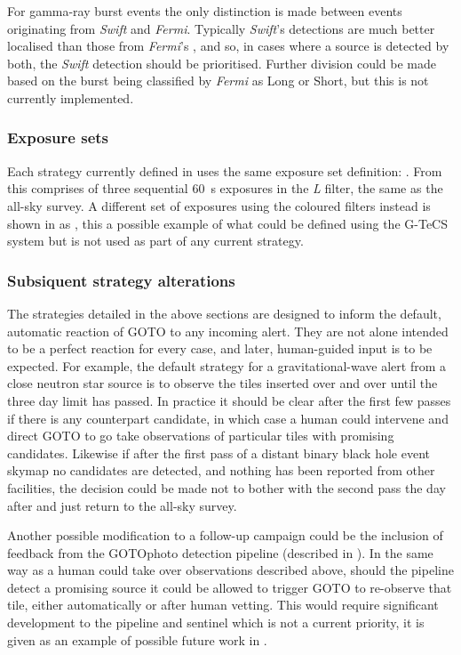 \begin{colsection}
For gamma-ray burst events the only distinction is made between events originating from \textit{Swift} and \textit{Fermi}. Typically \textit{Swift}'s  detections are much better localised than those from \textit{Fermi}'s , and so, in cases where a source is detected by both, the \textit{Swift} detection should be prioritised. Further division could be made based on the burst being classified by \textit{Fermi} as Long or Short, but this is not currently implemented.

\subsubsection{Exposure sets}

Each strategy currently defined in  uses the same exposure set definition: . From  this comprises of three sequential \SI{60}{\second} exposures in the \textit{L} filter, the same as the all-sky survey. A different set of exposures using the coloured filters instead is shown in  as , this a possible example of what could be defined using the G-TeCS system  but is not used as part of any current strategy.  %

\subsubsection{Subsiquent strategy alterations}

The strategies detailed in the above sections are designed to inform the default, automatic reaction of GOTO to any incoming alert. They are not alone intended to be a perfect reaction for every case, and later, human-guided input is to be expected. For example, the default strategy for a gravitational-wave alert from a close neutron star source is to observe the tiles inserted over and over until the three day limit has passed. In practice it should be clear after the first few passes if there is any counterpart candidate, in which case a human could intervene and direct GOTO to go take observations of particular tiles with promising candidates. Likewise if after the first pass of a distant binary black hole event skymap no candidates are detected, and nothing has been reported from other facilities, the decision could be made not to bother with the second pass the day after and just return to the all-sky survey.

Another possible modification to a follow-up campaign could be the inclusion of feedback from the GOTOphoto detection pipeline (described in ). In the same way as a human could take over observations described above, should the pipeline detect a promising source it could be allowed to trigger GOTO to re-observe that tile, either automatically or after human vetting. This would require significant development to the pipeline and sentinel which is not a current priority, it is given as an example of possible future work in .

\end{colsection}

